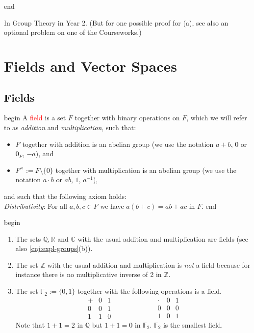 \documentclass[
  12pt,
  a4paper,
  twoside]{article}
\providecommand{\tightlist}{%
  \setlength{\itemsep}{0pt}\setlength{\parskip}{0pt}}
\theoremstyle{plain}
\theoremstyle{definition}
\begin{document}
\csname end

In Group Theory in Year 2. (But for one possible proof for (a), see also an optional problem on one of the Courseworks.)

\newpage

\hypertarget{vss}{%
\section{Fields and Vector Spaces}\label{vss}}

\hypertarget{ss-fields}{%
\subsection{Fields}\label{ss-fields}}

\csname begin\label{cnj:defn-field}
A \textcolor{red}{field} is a set \(F\) together with binary operations on \(F\), which we will refer to as \emph{addition} and \emph{multiplication}, such that:

\begin{itemize}
\tightlist
\item
  \(F\) together with addition is an abelian group (we use the notation \(a+b\), \(0\) or \(0_F\), \(-a\)), and
\item
  \(F^{\times} := F \setminus \{0\}\) together with multiplication is an abelian group (we use the notation \(a\cdot b\) or \(ab\), \(1\), \(a^{-1}\)),
\end{itemize}

and such that the following axiom holds:\\
\emph{Distributivity}: For all \(a,b,c \in F\) we have \(a(b+c) = ab + ac\) in \(F\).
\csname end

\csname begin\label{cnj:expl-fields}

\begin{enumerate}
\def\labelenumi{(\alph{enumi})}
\item
  The sets \(\mathbb{Q}, \mathbb{R}\) and \(\mathbb{C}\) with the usual addition and multiplication are fields (see also \ref{cnj:expl-groups}(b)).
\item
  The set \(\mathbb{Z}\) with the usual addition and multiplication is \emph{not} a field because for instance there is no multiplicative inverse of 2 in \(\mathbb{Z}\).
\item
  The set \(\mathbb{F}_{2} := \{ 0, 1 \}\) together with the following operations is a field.
  \[
  \begin{array}{c|cc}
  {+} & 0 & 1 \\ \hline 0 & 0 & 1 \\ 1 & 1 & 0
  \end{array}
  \qquad \qquad \qquad
  \begin{array}{c|cc}
  \cdot & 0 & 1 \\ \hline 0 & 0 & 0 \\ 1 & 0 & 1
  \end{array}
  \]
  Note that \(1 + 1 = 2\) in \(\mathbb{Q}\) but \(1 + 1 =0\) in \(\mathbb{F}_{2}\). \(\mathbb{F}_{2}\) is the smallest field.
\end{enumerate}
\end{document}
